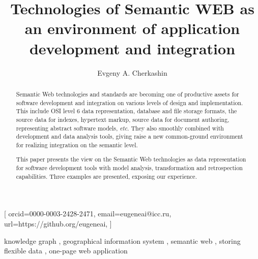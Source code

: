 \documentclass[
]{ceurart}
\begin{document}


\title{Technologies of Semantic WEB as an environment of application development and integration}
\author[1,2]{Evgeny A. Cherkashin}[%
orcid=0000-0003-2428-2471,
email=eugeneai@icc.ru,
url=https://github.org/eugeneai,
]
\address[1]{Matrosov Institute for System Dynamics and Control Theory of Siberian Branch of Russian Academy of Sciences, 134 Lermontov St, Irkutsk, 664033, Russian Federation}

\address[2]{Institute for Mathematics and Information Technologies, Irkutsk State University, 20~Gagarina Bulv, Irkutsk, 664003, Russian Federation}

\begin{abstract}
  Semantic Web technologies and standards are becoming one of productive assets for software development and integration on various levels of design and implementation.  This include OSI level 6 data representation, database and file storage formats, the source data for indexes, hypertext markup, source data for document authoring, representing abstract software models, \emph{etc}.  They also smoothly combined with development and data analysis tools, giving raise a new common-ground environment for realizing integration on the semantic level.

  This paper presents the view on the Semantic Web technologies as data representation for software development tools with model analysis, transformation and retrospection capabilities.  Three examples are presented, exposing our experience.
\end{abstract}

\begin{keywords}
  knowledge graph \sep
  geographical information system \sep
  semantic web \sep
  storing flexible data \sep
  one-page web application
\end{keywords}
\end{document}

